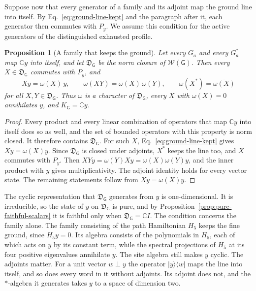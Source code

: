 \documentclass[11pt]{article}
\newtheorem{proposition}{Proposition}[section]
\theoremstyle{definition}
\newcommand{\C}{\mathbb C}
\newcommand{\ket}[1]{\lvert #1\rangle}
\newcommand{\bra}[1]{\langle #1\rvert}
\begin{document}
Suppose now that every generator of a family and its adjoint map the ground line into itself. By Eq.~\eqref{eq:ground-line-kept} and the paragraph after it, each generator then commutes with $P_y$. We assume this condition for the active generators of the distinguished exhausted profile.

\begin{proposition}[A family that keeps the ground]
\label{prop:ground-keeping-family}
Let every $G_a$ and every $G_a^*$ map $\C y$ into itself, and let $\mathfrak D_{\mathsf G}$ be the norm closure of $\mathcal W(\mathsf G)$. Then every $X\in\mathfrak D_{\mathsf G}$ commutes with $P_y$, and
\begin{equation}
 Xy=\omega(X)\,y,\qquad \omega(XY)=\omega(X)\,\omega(Y),\qquad \omega(X^*)=\overline{\omega(X)}
 \label{eq:ground-character}
\end{equation}
for all $X,Y\in\mathfrak D_{\mathsf G}$. Thus $\omega$ is a character of $\mathfrak D_{\mathsf G}$, every $X$ with $\omega(X)=0$ annihilates $y$, and $K_{\mathsf G}=\C y$.
\end{proposition}
\begin{proof}
Every product and every linear combination of operators that map $\C y$ into itself does so as well, and the set of bounded operators with this property is norm closed. It therefore contains $\mathfrak D_{\mathsf G}$. For such $X$, Eq.~\eqref{eq:ground-line-kept} gives $Xy=\omega(X)y$. Since $\mathfrak D_{\mathsf G}$ is closed under adjoints, $X^*$ keeps the line too, and $X$ commutes with $P_y$. Then $XYy=\omega(Y)Xy=\omega(X)\omega(Y)y$, and the inner product with $y$ gives multiplicativity. The adjoint identity holds for every vector state. The remaining statements follow from $Xy=\omega(X)y$.
\end{proof}

The cyclic representation that $\mathfrak D_{\mathsf G}$ generates from $y$ is one-dimensional. It is irreducible, so the state of $y$ on $\mathfrak D_{\mathsf G}$ is pure, and by Proposition~\ref{prop:pure-faithful-scalars} it is faithful only when $\mathfrak D_{\mathsf G}=\C I$. The condition concerns the family alone. The family consisting of the path Hamiltonian $H_5$ keeps the fine ground, since $H_5y=0$. Its algebra consists of the polynomials in $H_5$, each of which acts on $y$ by its constant term, while the spectral projections of $H_5$ at its four positive eigenvalues annihilate $y$. The site algebra still makes $y$ cyclic. The adjoints matter. For a unit vector $w\perp y$ the operator $\ket{y}\!\bra{w}$ maps the line into itself, and so does every word in it without adjoints. Its adjoint does not, and the $*$-algebra it generates takes $y$ to a space of dimension two.
\end{document}
